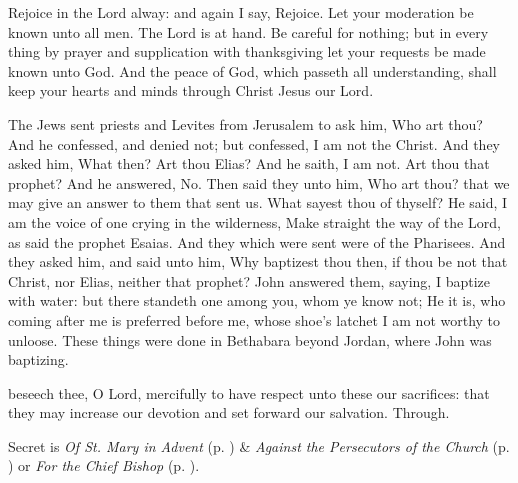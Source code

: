  Rejoice in the Lord alway: and again I say, Rejoice. Let your moderation be known unto all men. The Lord is at hand. Be careful for nothing; but in every thing by prayer and supplication with thanksgiving let your requests be made known unto God. And the peace of God, which passeth all understanding, shall keep your hearts and minds through Christ Jesus our Lord.



 The Jews sent priests and Levites from Jerusalem to ask him, Who art thou? And he confessed, and denied not; but confessed, I am not the Christ. And they asked him, What then? Art thou Elias? And he saith, I am not. Art thou that prophet? And he answered, No. Then said they unto him, Who art thou? that we may give an answer to them that sent us. What sayest thou of thyself? He said, I am the voice of one crying in the wilderness, Make straight the way of the Lord, as said the prophet Esaias. And they which were sent were of the Pharisees. And they asked him, and said unto him, Why baptizest thou then, if thou be not that Christ, nor Elias, neither that prophet? John answered them, saying, I baptize with water: but there standeth one among you, whom ye know not; He it is, who coming after me is preferred before me, whose shoe's latchet I am not worthy to unloose. These things were done in Bethabara beyond Jordan, where John was baptizing.


\secret
{} beseech thee, O Lord, mercifully to have respect unto these our sacrifices: that they may increase our devotion and set forward our salvation. Through.
\begin{rubric}
     Secret is \emph{Of St. Mary in Advent} (p. \pageref{SPMaryInAdvent}) \&  \emph{Against the Persecutors of the Church} (p. \pageref{SPAgainst}) or \emph{For the Chief Bishop} (p. \pageref{SPChiefBishop}).
\end{rubric}


